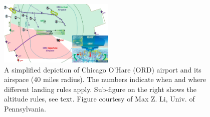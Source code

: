 \begin{figure}[t]
\centering
\includegraphics[width=0.49\textwidth]{figures/ATC_Example}
\caption{{\small A simplified depiction of Chicago O'Hare (ORD) airport and its airspace (40 miles radius). The numbers indicate when and where different landing rules apply. Sub-figure on the right shows the altitude rules, see text. Figure courtesy of Max Z. Li, Univ. of Pennsylvania.}} 
\label{fig:atc_example}
\end{figure}


